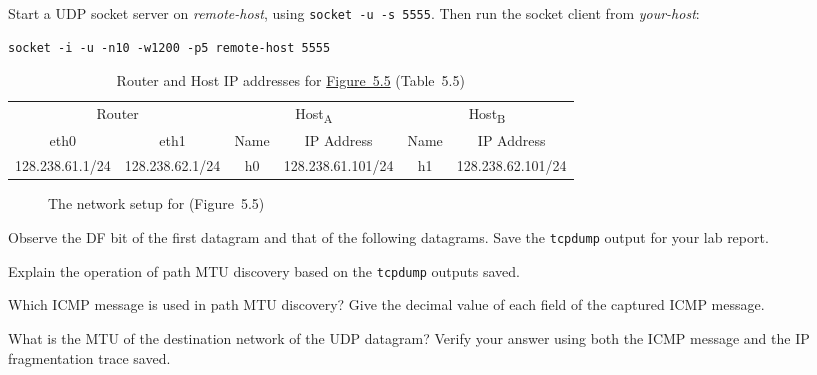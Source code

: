 \documentclass{../UTNetLab}
\begin{document}
    Start a UDP socket server on \textit{remote-host}, using \lstinline{socket -u -s 5555}.
    Then run the socket client from \textit{your-host}:
    \begin{lstlisting}[emph={your-host, remote-host}]
socket -i -u -n10 -w1200 -p5 remote-host 5555
    \end{lstlisting}

    \begin{table}[H]
        \caption{Router and Host IP addresses for \hyperref[fig:5.5]{Figure~5.5} (Table~5.5)}
        \centering
        \begin{tabular}{ *2c|*2c|*2c }
            \hline \hline
            \multicolumn{2}{c|}{Router} & \multicolumn{2}{c|}{Host\textsubscript{A}} & \multicolumn{2}{c}{Host\textsubscript{B}} \\
            eth0 & eth1 & Name & IP Address & Name & IP Address \\
            \hline 
            128.238.61.1/24 & 128.238.62.1/24 & h0 & 128.238.61.101/24 & h1 & 128.238.62.101/24 \\
            \hline \hline
            \end{tabular}
    \end{table}

    \begin{figure}[H]
        \centering
        \caption{The network setup for  (Figure~5.5)}
        \label{fig:5.5}
    \end{figure}

    Observe the DF bit of the first datagram and that of the following datagrams. Save the \lstinline{tcpdump} output for your lab report.

    \begin{report}
    \item Explain the operation of path MTU discovery based on the \lstinline{tcpdump} outputs saved.
    
    \item Which ICMP message is used in path MTU discovery? Give the decimal value of each field of the captured ICMP message.
    
    \item What is the MTU of the destination network of the UDP datagram? Verify your answer using both the ICMP message and the IP fragmentation trace saved.
    \end{report}
\end{document}
